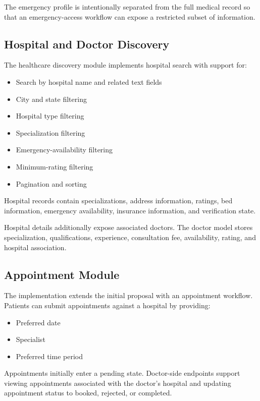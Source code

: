 \documentclass{tietreport}
\begin{document}
The emergency profile is intentionally separated from the full medical
record so that an emergency-access workflow can expose a restricted
subset of information.

\subsection{Hospital and Doctor Discovery}

The healthcare discovery module implements hospital search with support
for:

\begin{itemize}
  \item Search by hospital name and related text fields
  \item City and state filtering
  \item Hospital type filtering
  \item Specialization filtering
  \item Emergency-availability filtering
  \item Minimum-rating filtering
  \item Pagination and sorting
\end{itemize}

Hospital records contain specializations, address information, ratings,
bed information, emergency availability, insurance information, and
verification state.

Hospital details additionally expose associated doctors. The doctor
model stores specialization, qualifications, experience, consultation
fee, availability, rating, and hospital association.

\subsection{Appointment Module}

The implementation extends the initial proposal with an appointment
workflow. Patients can submit appointments against a hospital by
providing:

\begin{itemize}
  \item Preferred date
  \item Specialist
  \item Preferred time period
\end{itemize}

Appointments initially enter a pending state. Doctor-side endpoints
support viewing appointments associated with the doctor's hospital and
updating appointment status to booked, rejected, or completed.
\end{document}
